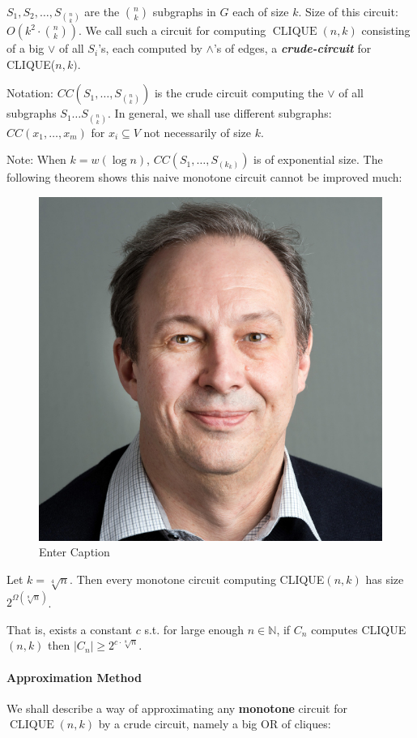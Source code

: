 $S_1, S_2, \ldots, S_{\binom{n}{k}}$ are the $\binom{n}{k}$ subgraphs in $G$ each of size $k$.
Size of this circuit: $O\left(k^2 \cdot\binom{n}{k}\right)$.
We call such a circuit for computing $\operatorname{CLIQUE}  (n, k)$ consisting of a big $\lor$ of all $S_i$'s, each computed by $\land$'s of edges, a \textbf{\textit{crude-circuit}} for CLIQUE($n, k)$.


Notation: $CC\left(S_1, \ldots, S_{\binom{n}{k}}\right)$ is the crude circuit computing the $\lor$ of all subgraphs $S_1 \ldots S_{n\choose k }$. In general, we shall use different subgraphs: $CC\left(x_1, \ldots, x_m\right)$ for $x_i \subseteq V$ not necessarily of size $k$.


Note: When $k=w(\log n)$, $CC\left(S_1, \ldots, S_{\left(k_k\right)}\right)$ is of exponential size.
The following theorem shows this naive monotone circuit cannot be improved much:

\begin{figure}
    \centering
    \includegraphics[width=0.25\linewidth]{images/RAZBOROV_Alexander.jpeg}
    \caption{Enter Caption}
    \label{fig:enter-label}
\end{figure}


\begin{theorem}
    [Razborov] Let $k=\sqrt[4]{n}$. Then every monotone circuit computing CLIQUE$(n, k)$ has size $2^{\Omega(\sqrt[8]{n})}$.
\end{theorem}
That is, exists a constant $c$ s.t. for large enough $n \in \mathbb{N}$, if $C_n$ computes CLIQUE$(n,k)$ then $\left|C_n\right| \geqslant 2^{c \cdot \sqrt[8]{n}}$.



\paragraph{Approximation Method}

We shall describe a way of approximating any \textbf{monotone} circuit for $\operatorname{CLIQUE}({n}, {k})$ by a crude circuit, namely a big OR of cliques:

